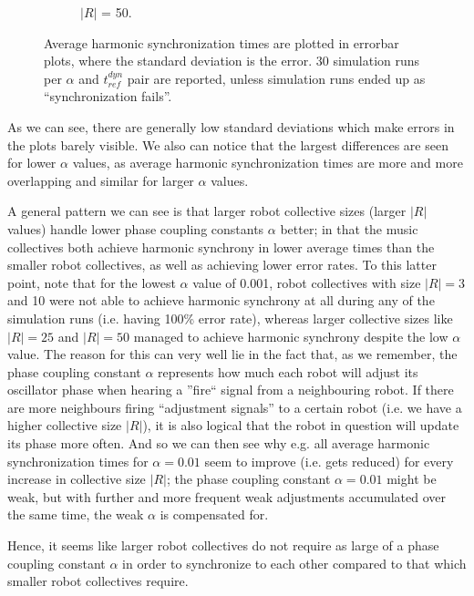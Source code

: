 \begin{figure}[ht!]
\begin{subfigure}[b]{0.5\textwidth}
		\caption{$|R|$ = 50.}
		\label{fig:sub:t_ref_dyn_x_alpha_collsize50}
	  \end{subfigure}
	  \caption{Average harmonic synchronization times are plotted in errorbar plots, where the standard deviation is the error. 30 simulation runs per $\alpha$ and $t_{ref}^{dyn}$ pair are reported, unless simulation runs ended up as ``synchronization fails''.}
	  \label{fig:phase_sync_hyperparam_tuning_experiment}
	\end{figure}
	
	As we can see, there are generally low standard deviations which make errors in the plots barely visible. We also can notice that the largest differences are seen for lower $\alpha$ values, as average harmonic synchronization times are more and more overlapping and similar for larger $\alpha$ values.
	
	A general pattern we can see is that larger robot collective sizes (larger $|R|$ values) handle lower phase coupling constants $\alpha$ better; in that the music collectives both achieve harmonic synchrony in lower average times than the smaller robot collectives, as well as achieving lower error rates. To this latter point, note that for the lowest $\alpha$ value of 0.001, robot collectives with size $|R|=3$ and 10 were not able to achieve harmonic synchrony at all during any of the simulation runs (i.e. having 100\% error rate), whereas larger collective sizes like $|R|=25$ and $|R|=50$ managed to achieve harmonic synchrony despite the low $\alpha$ value. The reason for this can very well lie in the fact that, as we remember, the phase coupling constant $\alpha$ represents how much each robot will adjust its oscillator phase when hearing a ''fire`` signal from a neighbouring robot. If there are more neighbours firing ``adjustment signals'' to a certain robot (i.e. we have a higher collective size $|R|$), it is also logical that the robot in question will update its phase more often. And so we can then see why e.g. all average harmonic synchronization times for $\alpha=0.01$ seem to improve (i.e. gets reduced) for every increase in collective size $|R|$; the phase coupling constant $\alpha=0.01$ might be weak, but with further and more frequent weak adjustments accumulated over the same time, the weak $\alpha$ is compensated for.
	
	Hence, it seems like larger robot collectives do not require as large of a phase coupling constant $\alpha$ in order to synchronize to each other compared to that which smaller robot collectives require.
	
